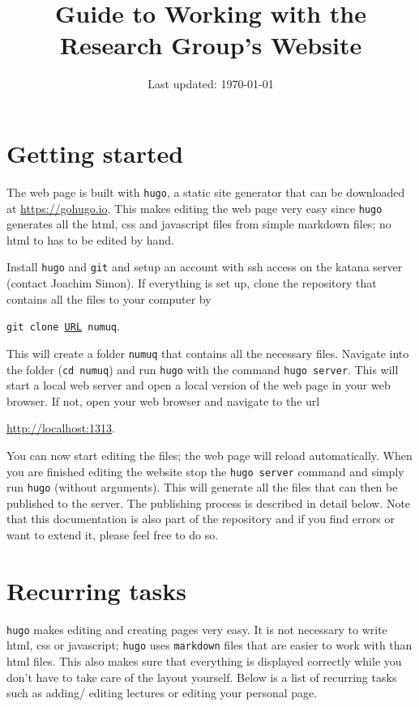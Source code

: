 \documentclass[a4paper,parskip=half]{scrartcl}
\title{\LARGE Guide to Working with the Research Group's Website}
\date{\normalsize Last updated: \today}
\begin{document}
%
\maketitle
\tableofcontents
\newpage
\section{Getting started}
The web page is built with \texttt{hugo}, a static site generator that can be
downloaded at \url{https://gohugo.io}. This makes editing the web page very easy
since \texttt{hugo} generates all the html, css and javascript files from simple
markdown files; no html to has to be edited by hand.

Install \texttt{hugo} and \texttt{git} and setup an account with ssh access on
the katana server (contact Joachim Simon). If everything is set up, clone the
repository that contains all the files to your computer by
\begin{center}
  \texttt{git clone \url{URL} numuq}.
\end{center}
This will create a folder \texttt{numuq} that contains all the necessary
files. Navigate into the folder (\texttt{cd numuq}) and run \texttt{hugo} with
the command \texttt{hugo server}. This will start a local web server and open a
local version of the web page in your web browser. If not, open your web browser
and navigate to the url
\begin{center}
  \url{http://localhost:1313}.
\end{center}
You can now start editing the files; the web page will reload
automatically. When you are finished editing the website stop the \texttt{hugo
  server} command and simply run \texttt{hugo} (without arguments). This will
generate all the files that can then be published to the server. The publishing
process is described in detail below. Note that this documentation is also part
of the repository and if you find errors or want to extend it, please feel free
to do so.

\newpage
\section{Recurring tasks}
\texttt{hugo} makes editing and creating pages very easy. It is not necessary to
write html, css or javascript; \texttt{hugo} uses \texttt{markdown} files that
are easier to work with than html files.  This also makes sure that everything
is displayed correctly while you don't have to take care of the layout
yourself. Below is a list of recurring tasks such as adding/ editing lectures or
editing your personal page.
\end{document}
